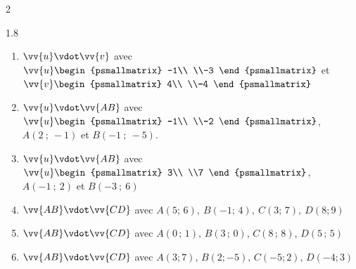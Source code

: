 \documentclass[main.tex]{subfiles}
\begin{document}
\begin{exercise}
\begin{multicols}{2}
\begin{spacing}{1.8}
\begin{enumerate}[label=\arabic*),leftmargin=*]
\item $\vv{u}\vdot\vv{v}$ avec $\vv{u}\begin{psmallmatrix}
	-1\\ \\-3
\end{psmallmatrix}$ et $\vv{v}\begin{psmallmatrix}
	4\\ \\-4
\end{psmallmatrix}$
 \item $\vv{u}\vdot\vv{AB}$ avec $\vv{u}\begin{psmallmatrix}
 	-1\\ \\-2
 \end{psmallmatrix}$, $A(2~;~-1)$ et $B( -1~;~-5)$. 
\item  $\vv{u}\vdot\vv{AB}$ avec $\vv{u}\begin{psmallmatrix}
	3\\ \\7
\end{psmallmatrix}$, $A(-1~;~2)$ et $B(-3~;~6)$
\item   $\vv{AB}\vdot\vv{CD}$ avec $A(5;\,6),~B(-1;\,4),~C(3;\,7),~D(8;9)$
\item   $\vv{AB}\vdot\vv{CD}$ avec $A(0\,;\,1)$, $B(3\,;\,0)$, $C(8\,;\,8)$, $D(5\,;\,5)$  
\item   $\vv{AB}\vdot\vv{CD}$ avec $A(3;7),\,B(2;-5),\,C(-5;2),\,D(-4;3)$  
\end{enumerate}	
\end{spacing}
\end{multicols}
\vspace{-0.5em}
\end{exercise} 
\end{document}
